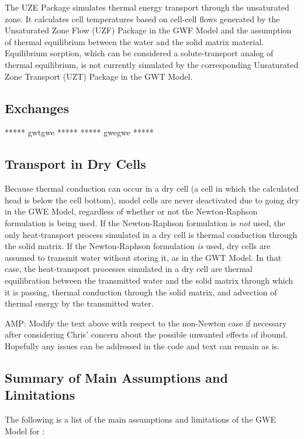 {The UZE Package simulates thermal energy transport through the unsaturated zone. It calculates cell temperatures based on cell-cell flows generated by the Unsaturated Zone Flow (UZF) Package in the GWF Model and the assumption of thermal equilibrium between the water and the solid matrix material. Equilibrium sorption, which can be considered a solute-transport analog of thermal equilibrium, is not currently simulated by the corresponding Unsaturated Zone Transport (UZT) Package in the GWT Model.

\subsection{Exchanges}

{\color{red}
***** gwtgwe *****
***** gwegwe *****
}

\subsection{Transport in Dry Cells}

Because thermal conduction can occur in a dry cell (a cell in which the calculated head is below the cell bottom), model cells are never deactivated due to going dry in the GWE Model, regardless of whether or not the Newton-Raphson formulation is being used. If the Newton-Raphson formulation is \textit{not} used, the only heat-transport process simulated in a dry cell is thermal conduction through the solid matrix. If the Newton-Raphson formulation \textit{is} used, dry cells are assumed to transmit water without storing it, as in the GWT Model. In that case, the heat-transport processes simulated in a dry cell are thermal equilibration between the transmitted water and the solid matrix through which it is passing, thermal conduction through the solid matrix, and advection of thermal energy by the transmitted water.

{\color{red} AMP: Modify the text above with respect to the non-Newton case if necessary after considering Chris' concern about the possible unwanted effects of ibound. Hopefully any issues can be addressed in the code and text can remain as is.}

\subsection{Summary of Main Assumptions and Limitations}

The following is a list of the main assumptions and limitations of the GWE Model for \mf:

}
